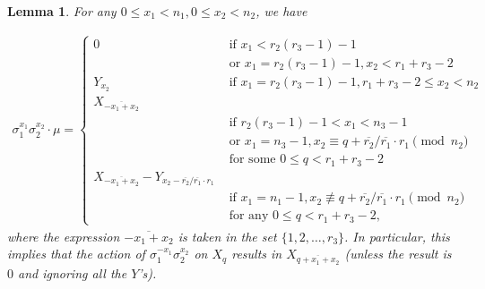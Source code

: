\documentclass[12pt,a4paper]{article}
\newtheorem{lemma}[theorem]{Lemma}
\theoremstyle{definition}
\newcommand{\uo}{\overline{r_2}}
\newcommand{\vo}{\overline{r_1}}
\begin{document}
\begin{lemma}\label{XY}
For any $0\leq x_1<n_1, 0\leq x_2<n_2$, we have
\iffalse
$$
\sigma_1^{x_1}\sigma_2^{x_2}\cdot \mu=
\begin{cases}
0 \quad &\!\begin{aligned} \text{ if }  &x_1<u(t-1)-1\\ &\text{ or } x_1=u(t-1)-1, x_2< v+t-2 \end{aligned}\\
Y_{x_2} \quad &\text{ if } x_1=u(t-1)-1, v+t-2\leq x_2 \\
X_{(-x_1+x_2)\pmod{t}+1} \quad &\!\begin{aligned}\text{ if } & t(u-1)-1< x_1<tu-1 \\&
 \text{ or }  x_1=tu-1, x_2\equiv q+\uo/\vo\cdot v\pmod{tv} \\
 &\text{ for some } 0\leq q<v+t-2  \end{aligned}\\
X_{(-x_1+x_2)\pmod{t}+1}-Y_{(x_2+(t-\uo/\vo)\cdot v)\pmod{n_2}} \quad &\!\begin{aligned}\text{ if } & x_1=tu-1, x_2\not\equiv q+\uo/\vo\cdot v\pmod{tv} \\
&\text{ for any } 0\leq q<v+t-2.\end{aligned}
\end{cases}
$$
\fi

\begin{align*}
\sigma_1^{x_1}\sigma_2^{x_2}\cdot \mu=
\begin{cases}
0   &\text{ if }  x_1<r_2(r_3-1)-1\\
& \text{ or } x_1=r_2(r_3-1)-1, x_2< r_1+r_3-2 \\
Y_{x_2} \quad &\text{ if } x_1=r_2(r_3-1)-1, r_1+r_3-2\leq x_2<n_2 \\
X_{\overline{-x_1+x_2}} \\
&\text{ if }  r_2(r_3-1)-1< x_1<n_3-1\\ 
&\text{ or }  x_1=n_3-1, x_2\equiv q+\uo/\vo\cdot r_1\pmod{n_2}\\
& \text{ for some } 0\leq q<r_1+r_3-2  \\
X_{\overline{-x_1+x_2}}-Y_{x_2-\uo/\vo\cdot r_1} \\
 &\text{ if }  x_1=n_1-1, x_2\not\equiv q+\uo/\vo\cdot r_1\pmod{n_2}\\
 & \text{ for any } 0\leq q<r_1+r_3-2,
\end{cases}
\end{align*}
where the expression $\overline{-x_1+x_2}$ is taken in the set $\{1,2,\dots, r_3\}$.
In particular, this implies that the action of $\sigma_1^{-x_1}\sigma_2^{x_2}$ on $X_q$ results in $X_{\overline{q+x_1+x_2}}$ (unless the result is $0$ and ignoring all the $Y$'s).
\end{lemma}
\end{document}

